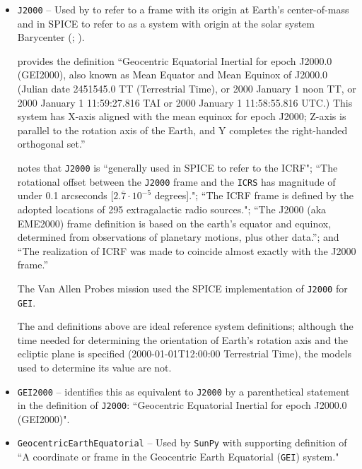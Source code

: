 \documentclass[draft]{agujournal2019}
\begin{document}
\begin{itemize}
    \parskip 0.1in 

    \item \texttt{J2000} -- Used by  to refer to a frame with its origin at Earth's center-of-mass and in SPICE to refer to as a system with origin at the solar system Barycenter (; ).
    
      provides the definition ``Geocentric Equatorial Inertial for epoch J2000.0 (GEI2000), also known as Mean Equator and Mean Equinox of J2000.0 (Julian date 2451545.0 TT (Terrestrial Time), or 2000 January 1 noon TT, or 2000 January 1 11:59:27.816 TAI or 2000 January 1 11:58:55.816 UTC.) This system has X-axis aligned with the mean equinox for epoch J2000; Z-axis is parallel to the rotation axis of the Earth, and Y completes the right-handed orthogonal set.''

     notes that \texttt{J2000} is ``generally used in SPICE to refer to the ICRF"; ``The rotational offset between the \texttt{J2000} frame and the \texttt{ICRS} has magnitude of under 0.1 arcseconds [$2.\overline{7}\cdot 10^{-5}$ degrees]."; ``The ICRF frame is defined by the adopted locations of 295 extragalactic radio sources."; ``The J2000 (aka EME2000) frame definition is based on the earth’s equator and equinox, determined from observations of planetary motions, plus other data.''; and ``The realization of ICRF was made to coincide almost exactly with the J2000 frame.'' 


    The Van Allen Probes mission used the SPICE implementation of \texttt{J2000} for \texttt{GEI}. 
    
    The  and  definitions above are ideal reference system definitions; although the time needed for determining the orientation of Earth's rotation axis and the ecliptic plane is specified (2000-01-01T12:00:00 Terrestrial Time), the models used to determine its value are not.

    \item \texttt{GEI2000} --  identifies this as equivalent to \texttt{J2000} by a parenthetical statement in the definition of \texttt{J2000}: ``Geocentric Equatorial Inertial for epoch J2000.0 (GEI2000)".

    \item \texttt{GeocentricEarthEquatorial} -- Used by \texttt{SunPy} with supporting definition of ``A coordinate or frame in the Geocentric Earth Equatorial (\texttt{GEI}) system."
    

\end{itemize}
\end{document}

